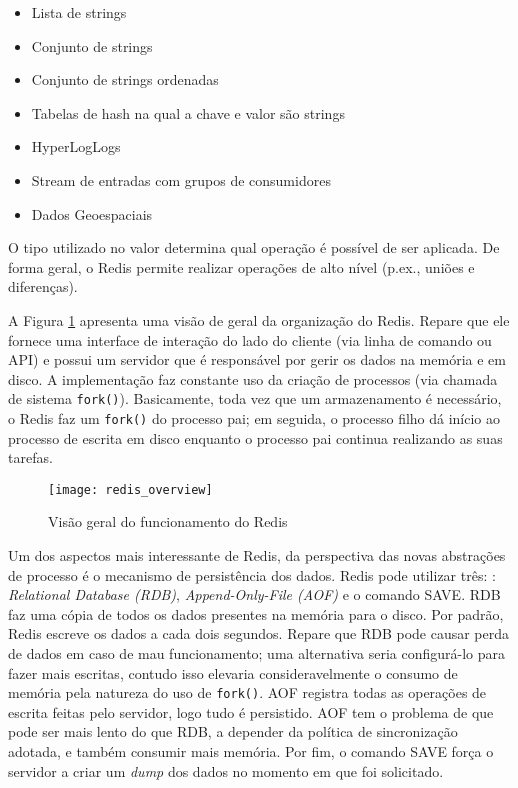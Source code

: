 \begin{itemize}
  \item Lista de strings
  \item Conjunto de strings
  \item Conjunto de strings ordenadas
  \item Tabelas de hash na qual a chave e valor são strings
  \item HyperLogLogs
  \item Stream de entradas com grupos de consumidores
  \item Dados Geoespaciais
\end{itemize}

O tipo utilizado no valor determina qual operação é possível de ser aplicada.
De forma geral, o Redis permite realizar operações de alto nível (p.ex., uniões
e diferenças).

A Figura \ref{fig:redis} apresenta uma visão de geral da organização do Redis.
Repare que ele fornece uma interface de interação do lado do cliente (via
linha de comando ou API) e possui um servidor que é responsável por gerir os dados na memória e em disco.
A implementação faz constante uso da criação de processos (via
chamada de sistema \texttt{fork()}). Basicamente, toda vez que um armazenamento
é necessário, o Redis faz um \texttt{fork()} do processo pai; em seguida, o
processo filho dá início ao processo de escrita em disco enquanto o processo
pai continua realizando as suas tarefas. 

\begin{figure}[!h]
  \centering
  \texttt{[image: redis\_overview]}
  \caption{Visão geral do funcionamento do Redis}
  \label{fig:redis}
\end{figure}

Um dos aspectos mais interessante de Redis, da perspectiva das novas
abstrações de processo é o mecanismo de persistência dos dados. Redis pode
utilizar três: \citep{redisio}: \emph{Relational Database (RDB)},
\emph{Append-Only-File (AOF)} e o comando SAVE. RDB faz uma cópia de todos os
dados presentes na memória para o disco. Por padrão, Redis escreve os dados a
cada dois segundos. Repare que RDB pode causar perda de dados em caso de mau
funcionamento; uma alternativa seria configurá-lo para fazer mais escritas,
contudo isso elevaria consideravelmente o consumo de memória pela natureza do
uso de \texttt{fork()}. AOF registra todas as operações de escrita feitas pelo
servidor, logo tudo é persistido. AOF tem o problema de que pode ser mais lento
do que RDB, a depender da política de sincronização adotada, e também consumir
mais memória.  Por fim, o comando SAVE força o servidor a criar um \emph{dump}
dos dados no momento em que foi solicitado.

